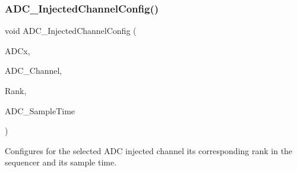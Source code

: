 \subsubsection{\texorpdfstring{ADC\_InjectedChannelConfig()}{ADC\_InjectedChannelConfig()}}
{\footnotesize\ttfamily void A\+D\+C\+\_\+\+Injected\+Channel\+Config (\begin{DoxyParamCaption}\item[{\mbox{\hyperlink{struct_a_d_c___type_def}{A\+D\+C\+\_\+\+Type\+Def}} $\ast$}]{A\+D\+Cx,  }\item[{uint8\+\_\+t}]{A\+D\+C\+\_\+\+Channel,  }\item[{uint8\+\_\+t}]{Rank,  }\item[{uint8\+\_\+t}]{A\+D\+C\+\_\+\+Sample\+Time }\end{DoxyParamCaption})}



Configures for the selected A\+DC injected channel its corresponding rank in the sequencer and its sample time. 


